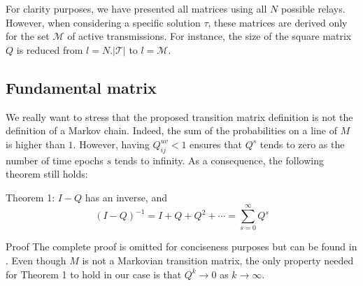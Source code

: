\documentclass[a4paper]{article}
\newcommand{\T}{\mathcal{T}}
\newcommand{\M}{\mathcal{M}}
\newcommand{\Mmatrix}{M}
\newcommand{\Qmatrix}{Q}
\newcommand{\Qe}[4]{\Qmatrix_{#1#2}^{#3#4}}
\begin{document}
For clarity purposes, we have presented all matrices using all $N$ possible relays. However, when considering a specific solution $\tau$, these matrices are derived only for the set $\M$ of active transmissions. For instance, the size of the square matrix $\Qmatrix$ is reduced from $l=N.|\T|$ to $l=\M$.  

\subsection{Fundamental matrix}

We really want to stress that the proposed transition matrix definition is not the definition of a Markov chain. Indeed, the sum of the probabilities on a line of $M$ is higher than $1$. However, having $\Qe{i}{j}{u}{v}<1$ ensures that $\Qmatrix^s$ tends to zero as the number of time epochs $s$ tends to infinity. 
As a consequence, the following theorem still holds:

{\sc Theorem 1:} $I-\Qmatrix$ has an inverse, and
\[
(I-\Qmatrix)^{-1} = I + Q + Q^2+ \cdots = \sum_{s=0}^{\infty} Q^s
\]

{\sc Proof}
The complete proof is omitted for conciseness purposes but can be found in \cite{markov}. Even though $\Mmatrix$ is not a Markovian transition matrix, the only property needed for Theorem 1 to hold in our case is that $\Qmatrix^k \rightarrow 0$ as $k \rightarrow \infty$. 
\end{document}
